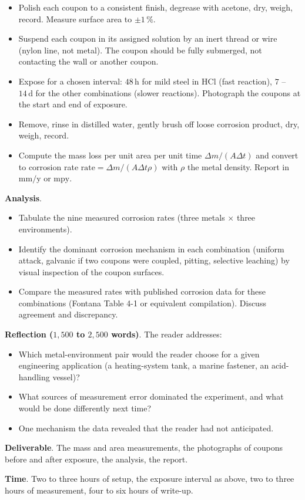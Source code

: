 \begin{project}
\begin{itemize}[leftmargin=*]
\item Polish each coupon to a consistent finish, degrease with
  acetone, dry, weigh, record. Measure surface area to $\pm 1\,\%$.
\item Suspend each coupon in its assigned solution by an inert thread
  or wire (nylon line, not metal). The coupon should be fully
  submerged, not contacting the wall or another coupon.
\item Expose for a chosen interval: $48\,\text{h}$ for mild steel
  in HCl (fast reaction), $7$ -- $14\,\text{d}$ for the other
  combinations (slower reactions). Photograph the coupons at the start
  and end of exposure.
\item Remove, rinse in distilled water, gently brush off loose
  corrosion product, dry, weigh, record.
\item Compute the mass loss per unit area per unit time
  $\Delta m / (A \Delta t)$ and convert to corrosion rate
  $\text{rate} = \Delta m / (A \Delta t \rho)$ with $\rho$ the
  metal density. Report in $\text{mm}/\text{y}$ or $\text{mpy}$.
\end{itemize}

\textbf{Analysis}.

\begin{itemize}[leftmargin=*]
\item Tabulate the nine measured corrosion rates (three metals
  $\times$ three environments).
\item Identify the dominant corrosion mechanism in each combination
  (uniform attack, galvanic if two coupons were coupled, pitting,
  selective leaching) by visual inspection of the coupon surfaces.
\item Compare the measured rates with published corrosion data for
  these combinations (Fontana Table 4-1 or equivalent compilation).
  Discuss agreement and discrepancy.
\end{itemize}

\textbf{Reflection ($1{,}500$ to $2{,}500$ words)}. The reader
addresses:

\begin{itemize}[leftmargin=*]
\item Which metal-environment pair would the reader choose for a
  given engineering application (a heating-system tank, a marine
  fastener, an acid-handling vessel)?
\item What sources of measurement error dominated the experiment, and
  what would be done differently next time?
\item One mechanism the data revealed that the reader had not
  anticipated.
\end{itemize}

\textbf{Deliverable}. The mass and area measurements, the photographs
of coupons before and after exposure, the analysis, the report.

\textbf{Time}. Two to three hours of setup, the exposure interval as
above, two to three hours of measurement, four to six hours of
write-up.
\end{project}

